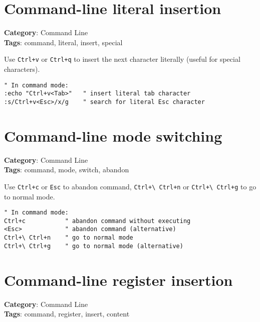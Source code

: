 {{{\section{Command-line literal insertion}

\textbf{Category}: Command Line\\ \textbf{Tags}: command, literal, insert, special
\vspace{0.5cm}

Use {\footnotesize \Verb§Ctrl+v§} or {\footnotesize \Verb§Ctrl+q§} to insert the next character literally (useful for special characters).

\begin{Exa*}{}
\begin{Verbatim}[fontsize=\footnotesize, breaklines, breakanywhere]
" In command mode:
:echo "Ctrl+v<Tab>"   " insert literal tab character
:s/Ctrl+v<Esc>/x/g    " search for literal Esc character
\end{Verbatim}
\end{Exa*}

\section{Command-line mode switching}

\textbf{Category}: Command Line\\ \textbf{Tags}: command, mode, switch, abandon
\vspace{0.5cm}

Use {\footnotesize \Verb§Ctrl+c§} or {\footnotesize \Verb§Esc§} to abandon command, {\footnotesize \Verb§Ctrl+\ Ctrl+n§} or {\footnotesize \Verb§Ctrl+\ Ctrl+g§} to go to normal mode.

\begin{Exa*}{}
\begin{Verbatim}[fontsize=\footnotesize, breaklines, breakanywhere]
" In command mode:
Ctrl+c           " abandon command without executing
<Esc>            " abandon command (alternative)
Ctrl+\ Ctrl+n    " go to normal mode
Ctrl+\ Ctrl+g    " go to normal mode (alternative)
\end{Verbatim}
\end{Exa*}

\section{Command-line register insertion}

\textbf{Category}: Command Line\\ \textbf{Tags}: command, register, insert, content
\vspace{0.5cm}

}}}
